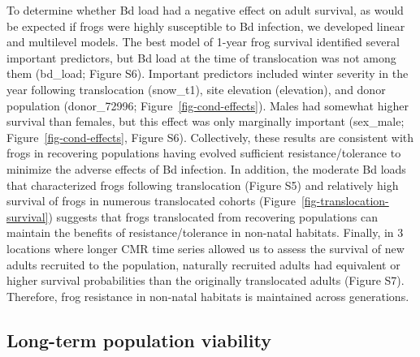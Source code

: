 \documentclass[9pt,twocolumn,twoside,lineno]{pnas-new}
\begin{document}
To determine whether Bd load had a negative effect on adult survival, as
would be expected if frogs were highly susceptible to Bd infection, we
developed linear and multilevel models. The best model of 1-year frog
survival identified several important predictors, but Bd load at the
time of translocation was not among them (bd\_load;
Figure S6). Important predictors included
winter severity in the year following translocation (snow\_t1), site
elevation (elevation), and donor population (donor\_72996;
Figure~\ref{fig-cond-effects}). Males had somewhat higher survival than
females, but this effect was only marginally important (sex\_male;
Figure~\ref{fig-cond-effects}, Figure S6).
Collectively, these results are consistent with frogs in recovering
populations having evolved sufficient resistance/tolerance to minimize
the adverse effects of Bd infection. In addition, the moderate Bd loads
that characterized frogs following translocation
(Figure S5) and relatively high survival of
frogs in numerous translocated cohorts
(Figure~\ref{fig-translocation-survival}) suggests that frogs
translocated from recovering populations can maintain the benefits of
resistance/tolerance in non-natal habitats. Finally, in 3 locations
where longer CMR time series allowed us to assess the survival of new
adults recruited to the population, naturally recruited adults had
equivalent or higher survival probabilities than the originally
translocated adults (Figure S7). Therefore,
frog resistance in non-natal habitats is maintained across generations.

\subsection*{Long-term population viability}
\end{document}
